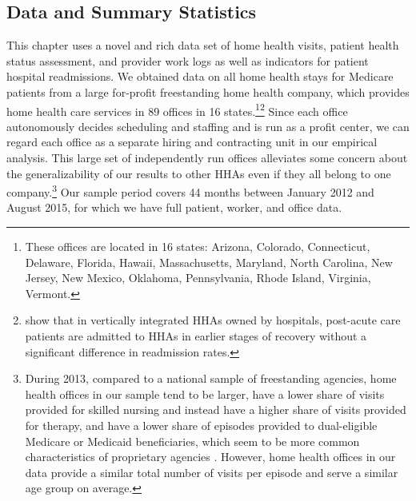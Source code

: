 \documentclass[final,12pt, notitlepage]{article}
\begin{document}
\subsection{Data and Summary Statistics} \label{sec:data_ch3}
This chapter uses a novel and rich data set of home health visits, patient health status assessment, and provider work logs as well as indicators for patient hospital readmissions.
We obtained data on all home health stays for Medicare patients from a large for-profit freestanding home health company, which provides home health care services in 89 offices in 16 states.\footnote{These offices are located in 16 states: Arizona, Colorado, Connecticut, Delaware, Florida, Hawaii, Massachusetts, Maryland, North Carolina, New Jersey, New Mexico, Oklahoma, Pennsylvania, Rhode Island, Virginia, Vermont.
}\footnote{\citet{David2013} show that in vertically integrated HHAs owned by hospitals, post-acute care patients are admitted to HHAs in earlier stages of recovery without a significant difference in readmission rates.
}
Since each office autonomously decides scheduling and staffing and is run as a profit center, we can regard each office as a separate hiring and contracting unit in our empirical analysis.
This large set of independently run offices alleviates some concern about the generalizability of our results to other HHAs even if they all belong to one company.\footnote{During 2013, compared to a national sample of freestanding agencies, home health offices in our sample tend to be larger, have a lower share of visits provided for skilled nursing and instead have a higher share of visits provided for therapy, and have a lower share of episodes provided to dual-eligible Medicare or Medicaid beneficiaries, which seem to be more common characteristics of proprietary agencies \citep{Cabin2014, MedPAC2016hh}.
 However, home health offices in our data provide a similar total number of visits per episode and serve a similar age group on average.%
}
Our sample period covers 44 months between January 2012 and August 2015, for which we have full patient, worker, and office data.
\end{document}
